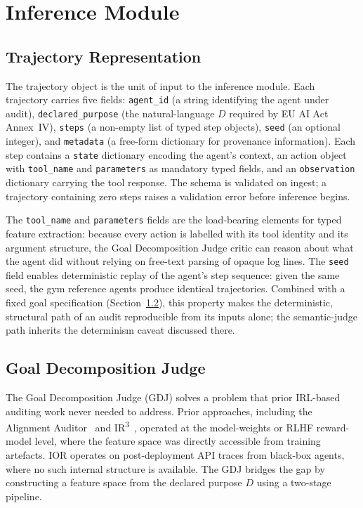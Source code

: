 \section{Inference Module}
\label{sec:inference}

\subsection{Trajectory Representation}

The trajectory object is the unit of input to the inference module. Each
trajectory carries five fields: \texttt{agent_id} (a string identifying the agent
under audit), \texttt{declared_purpose} (the natural-language $D$ required by EU
AI Act Annex~IV), \texttt{steps} (a non-empty list of typed step objects),
\texttt{seed} (an optional integer), and \texttt{metadata} (a free-form
dictionary for provenance information). Each step contains a \texttt{state}
dictionary encoding the agent's context, an action object with \texttt{tool_name}
and \texttt{parameters} as mandatory typed fields, and an \texttt{observation}
dictionary carrying the tool response. The schema is validated on ingest; a
trajectory containing zero steps raises a validation error before inference
begins.

The \texttt{tool_name} and \texttt{parameters} fields are the load-bearing
elements for typed feature extraction: because every action is labelled with its
tool identity and its argument structure, the Goal Decomposition Judge critic can
reason about what the agent did without relying on free-text parsing of opaque log
lines. The \texttt{seed} field enables deterministic replay of the agent's step
sequence: given the same seed, the gym reference agents produce identical
trajectories. Combined with a fixed goal specification
(Section~\ref{subsec:gdj}), this property makes the deterministic, structural path of
an audit reproducible from its inputs alone; the semantic-judge path inherits the
determinism caveat discussed there.

\subsection{Goal Decomposition Judge}
\label{subsec:gdj}

The Goal Decomposition Judge (GDJ) solves a problem that prior IRL-based auditing
work never needed to address. Prior approaches, including the Alignment
Auditor~\citep{alignmentAuditor2025} and IR\textsuperscript{3}~\citep{ir3contrastive},
operated at the model-weights or RLHF reward-model level, where the feature space
was directly accessible from training artefacts. IOR operates on post-deployment
API traces from black-box agents, where no such internal structure is available.
The GDJ bridges the gap by constructing a feature space from the declared purpose
$D$ using a two-stage pipeline.

